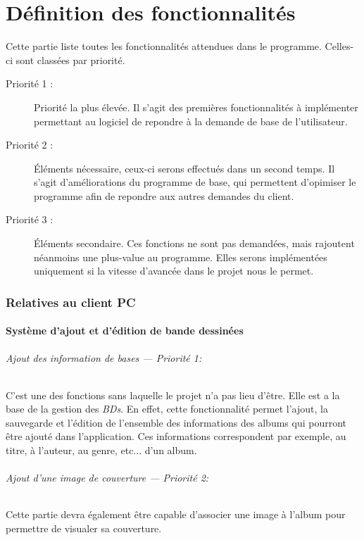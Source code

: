 \part{Définition des fonctionnalités}
Cette partie liste toutes les fonctionnalités attendues dans le programme. Celles-ci sont classées par priorité.

\begin{description}
\item [Priorité 1 :]
	Priorité la plus élevée. Il s'agit des premières fonctionnalités à implémenter permettant au logiciel de repondre à la demande de base de l'utilisateur.

\item [Priorité 2 :]
	Éléments nécessaire, ceux-ci serons effectués dans un second temps. Il s'agit d'améliorations du programme de base, qui permettent d'opimiser le programme afin de repondre aux autres demandes du client.  

\item [Priorité 3 :]
	Éléments secondaire. Ces fonctions ne sont pas demandées, mais rajoutent néanmoins une plus-value au programme. Elles serons implémentées uniquement si la vitesse d'avancée dans le projet nous le permet.
\end{description}


\section{Relatives au client PC}

\subsection{Système d'ajout et d'édition de bande dessinées}
\paragraph{Ajout des information de bases ---  \textit{Priorité 1}:}
C'est une des fonctions sans laquelle le projet n'a pas lieu d'être. Elle est a la base de la gestion des \emph{BDs}. En effet, cette fonctionnalité permet l'ajout, la sauvegarde et l'édition de l'ensemble des informations des albums qui pourront être ajouté dans l'application. Ces informations correspondent par exemple, au titre, à l'auteur, au genre, etc... d'un album.
\paragraph{Ajout d'une image de couverture ---  \textit{Priorité 2}:}  
Cette partie devra également être capable d'associer une image à l'album pour permettre de visualer sa couverture.
